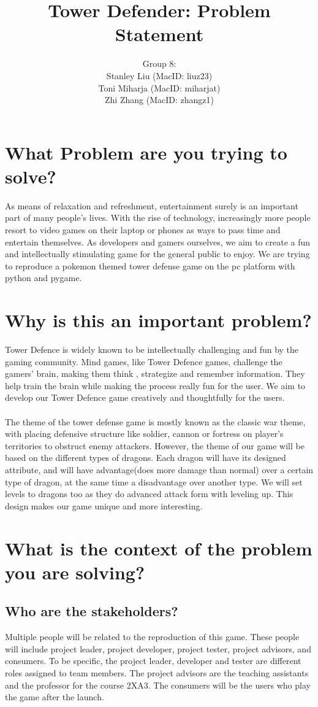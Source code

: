 \documentclass[12pt]{article}
\title{Tower Defender: Problem Statement}
\author{Group 8: \\
                 Stanley Liu (MacID: liuz23) \\    
                 Toni Miharja (MacID: miharjat)\\
                 Zhi Zhang (MacID: zhangz1)}
\begin{document}
\maketitle

\section {What Problem are you trying to solve?}
As means of relaxation and refreshment, entertainment surely is an important part of many people’s lives. With the rise of technology, increasingly more people resort to video games on their laptop or phones as ways to pass time and entertain themselves. As developers and gamers ourselves, we aim to create a fun and intellectually stimulating game for the general public to enjoy. We are trying to reproduce a pokemon themed tower defense game on the pc platform with python and pygame.

\section {Why is this an important problem?}
Tower Defence is widely known to be intellectually challenging and fun by the gaming community. Mind games, like Tower Defence games, challenge the gamers’ brain, making them think , strategize and remember information. They help train the brain while making the process really fun for the user. We aim to develop  our Tower Defence game creatively and thoughtfully for the users.\\\\The theme of the tower defense game is mostly known as the classic war theme, with placing defensive structure like soldier, cannon or fortress on player’s territories to obstruct enemy attackers. However, the theme of our game will be based on the different types of dragons. Each dragon will have its designed attribute, and will have advantage(does more damage than normal) over a certain type of dragon, at the same time a disadvantage over another type. We will set levels to dragons too as they do advanced attack form with leveling up. This design makes our game unique and more interesting.
\section {What is the context of the problem you are solving?}
    \subsection {Who are the stakeholders?}
    Multiple people will be related to the reproduction of this game. These people will include project leader, project developer, project tester, project advisors, and consumers. To be specific, the project leader, developer and tester are different roles assigned to team members. The project advisors are the teaching assistants and the professor for the course 2XA3. The consumers will be the users who play the game after the launch.
\end{document}
